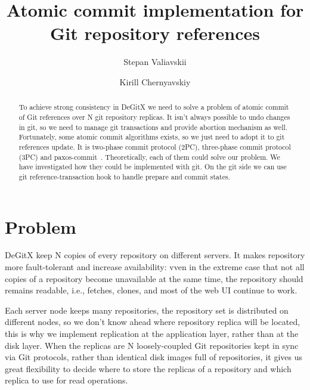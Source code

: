\documentclass[acmlarge, screen, nonacm]{acmart}
\title{Atomic commit implementation for Git repository references}
\author{Stepan Valiavskii}
\author{Kirill Chernyavskiy}
\begin{document}
\begin{abstract}
  To achieve strong consistency in DeGitX we need to solve a problem of atomic commit of Git references
  over N git repository replicas.
  It isn't always possible to undo changes in git, so we need to manage git transactions
  and provide abortion mechanism as well.
  Fortunately, some atomic commit algorithms exists, so we just need to adopt it to git references update.
  It is two-phase commit protocol (2PC), three-phase commit protocol (3PC) and paxos-commit~\cite{paxos-commit}.
  Theoretically, each of them could solve our problem.
  We have investigated how they could be implemented with git.
  On the git side we can use git reference-transaction hook to handle prepare and commit states.
\end{abstract}

\maketitle

\section{Problem}

DeGitX keep N copies of every repository on different servers.
It makes repository more fault-tolerant and increase availability:
vven in the extreme case that not all copies of a repository become unavailable at
the same time, the repository should remains readable, i.e., fetches, clones, and
most of the web UI continue to work.

Each server node keeps many repositories, the repository set is distributed on different nodes,
so we don't know ahead where repository replica will be located, this is why
we implement replication at the application layer, rather than at the disk layer.
When the replicas are N loosely-coupled Git repositories kept
in sync via Git protocols, rather than identical disk images full of repositories,
it gives us great flexibility to decide where to
store the replicas of a repository and which replica to use for read operations.
\end{document}
